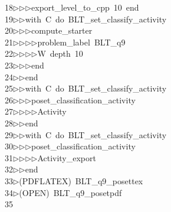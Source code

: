 \begin{tabbing}
18\>$\triangleright$\>$\triangleright$\>$\triangleright$\>export\_level\_to\_cpp\ 10\ end\ \\[0pt]
19\>$\triangleright$\>$\triangleright$\>with\ C\ do\ BLT\_set\_classify\_activity\ \\[0pt]
20\>$\triangleright$\>$\triangleright$\>$\triangleright$\>compute\_starter\ \\[0pt]
21\>$\triangleright$\>$\triangleright$\>$\triangleright$\>$\triangleright$\>problem\_label\ BLT\_q9\ \\[0pt]
22\>$\triangleright$\>$\triangleright$\>$\triangleright$\>$\triangleright$\>W\ depth\ 10\ \\[0pt]
23\>$\triangleright$\>$\triangleright$\>$\triangleright$\>end\ \\[0pt]
24\>$\triangleright$\>$\triangleright$\>end\ \\[0pt]
25\>$\triangleright$\>$\triangleright$\>with\ C\ do\ BLT\_set\_classify\_activity\ \\[0pt]
26\>$\triangleright$\>$\triangleright$\>$\triangleright$\>poset\_classification\_activity\ \\[0pt]
27\>$\triangleright$\>$\triangleright$\>$\triangleright$\>$\triangleright$\>Activity\ \\[0pt]
28\>$\triangleright$\>$\triangleright$\>end\ \\[0pt]
29\>$\triangleright$\>$\triangleright$\>with\ C\ do\ BLT\_set\_classify\_activity\ \\[0pt]
30\>$\triangleright$\>$\triangleright$\>$\triangleright$\>poset\_classification\_activity\ \\[0pt]
31\>$\triangleright$\>$\triangleright$\>$\triangleright$\>$\triangleright$\>Activity\_export\ \\[0pt]
32\>$\triangleright$\>$\triangleright$\>end\\[0pt]
33\>$\triangleright$\>(PDFLATEX)\ BLT\_q9\_posettex\\[0pt]
34\>$\triangleright$\>(OPEN)\ BLT\_q9\_posetpdf\\[0pt]
35\>\end{tabbing}
